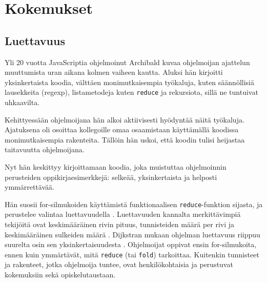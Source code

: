 \vspace{21.5pt}
\chapter{Kokemukset}




\section{Luettavuus}

Yli 20 vuotta JavaScriptia ohjelmoinut Archibald kuvaa ohjelmoijan ajattelun muuttumista uran aikana kolmen vaiheen kautta. Aluksi hän kirjoitti yksinkertaista koodia, välttäen monimutkaisempia työkaluja, kuten säännöllisiä lausekkeita (regexp), listametodeja kuten \texttt{reduce} ja rekursiota, sillä ne tuntuivat uhkaavilta. \citep{is_reduce_bad}

Kehittyessään ohjelmoijana hän alkoi aktiivisesti hyödyntää näitä työkaluja. Ajatuksena oli osoittaa kollegoille omaa osaamistaan käyttämällä koodissa monimutkaisempia rakenteita. Tällöin hän uskoi, että koodin tulisi heijastaa taitavuutta ohjelmoijana. \citep{is_reduce_bad}

Nyt hän keskittyy kirjoittamaan koodia, joka muistuttaa ohjelmoinnin perusteiden oppikirjaesimerkkejä: selkeää, yksinkertaista ja helposti ymmärrettävää. \citep{is_reduce_bad}

Hän suosii for-silmukoiden käyttämistä funktionaalisen \texttt{reduce}-funktion sijasta, ja perustelee valintaa luettavuudella \cite{is_reduce_bad}. Luettavuuden kannalta merkittävimpiä tekijöitä ovat keskimääräinen rivin pituus, tunnisteiden määrä per rivi ja keskimääräinen sulkeiden määrä \cite[8]{busereadability}. Dijkstran mukaan ohjelman luettavuus riippuu suurelta osin sen  yksinkertaisuudesta \cite{dijkstra1976discipline}. Ohjelmoijat oppivat ensin for-silmukoita, ennen kuin ymmärtävät, mitä \texttt{reduce} (tai \texttt{fold}) tarkoittaa. Kuitenkin tunnisteet ja rakenteet, jotka ohjelmoija tuntee, ovat henkilökohtaisia ja perustuvat kokemuksiin sekä opiskelutaustaan.

